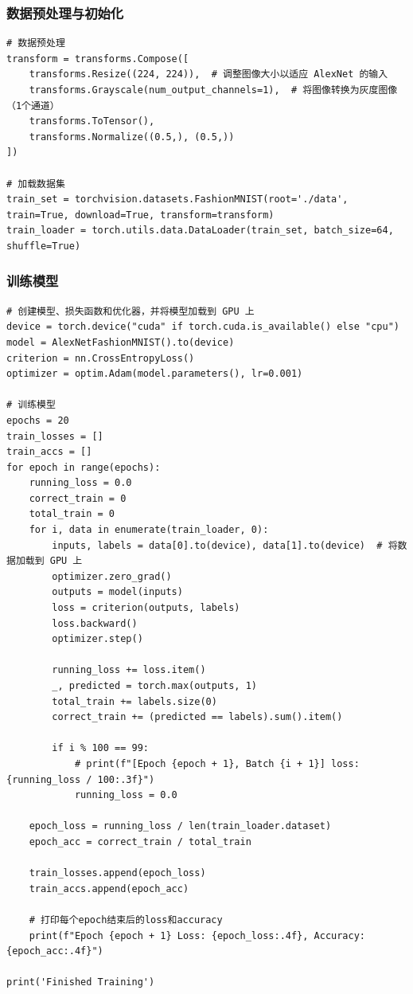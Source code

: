 \documentclass[a4paper,12pt]{article}
\begin{document}
\subsubsection{数据预处理与初始化}
\begin{lstlisting}
# 数据预处理
transform = transforms.Compose([
    transforms.Resize((224, 224)),  # 调整图像大小以适应 AlexNet 的输入
    transforms.Grayscale(num_output_channels=1),  # 将图像转换为灰度图像（1个通道）
    transforms.ToTensor(),
    transforms.Normalize((0.5,), (0.5,))
])

# 加载数据集
train_set = torchvision.datasets.FashionMNIST(root='./data', train=True, download=True, transform=transform)
train_loader = torch.utils.data.DataLoader(train_set, batch_size=64, shuffle=True)

\end{lstlisting}

\subsubsection{训练模型}
\begin{lstlisting}
# 创建模型、损失函数和优化器，并将模型加载到 GPU 上
device = torch.device("cuda" if torch.cuda.is_available() else "cpu")
model = AlexNetFashionMNIST().to(device)
criterion = nn.CrossEntropyLoss()
optimizer = optim.Adam(model.parameters(), lr=0.001)

# 训练模型
epochs = 20
train_losses = []
train_accs = []
for epoch in range(epochs):
    running_loss = 0.0
    correct_train = 0
    total_train = 0
    for i, data in enumerate(train_loader, 0):
        inputs, labels = data[0].to(device), data[1].to(device)  # 将数据加载到 GPU 上
        optimizer.zero_grad()
        outputs = model(inputs)
        loss = criterion(outputs, labels)
        loss.backward()
        optimizer.step()
        
        running_loss += loss.item()
        _, predicted = torch.max(outputs, 1)
        total_train += labels.size(0)
        correct_train += (predicted == labels).sum().item()

        if i % 100 == 99:
            # print(f"[Epoch {epoch + 1}, Batch {i + 1}] loss: {running_loss / 100:.3f}")
            running_loss = 0.0

    epoch_loss = running_loss / len(train_loader.dataset)
    epoch_acc = correct_train / total_train

    train_losses.append(epoch_loss)
    train_accs.append(epoch_acc)

    # 打印每个epoch结束后的loss和accuracy
    print(f"Epoch {epoch + 1} Loss: {epoch_loss:.4f}, Accuracy: {epoch_acc:.4f}")

print('Finished Training')

\end{lstlisting}
\end{document}
